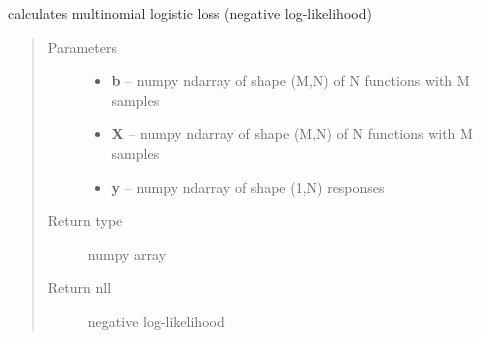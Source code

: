\documentclass[letterpaper,10pt,english]{sphinxmanual}
\begin{document}

\begin{fulllineitems}
\label{regression:regression.mlogit_loss}
calculates multinomial logistic loss (negative log-likelihood)
\begin{quote}\begin{description}
\item[{Parameters}] \leavevmode\begin{itemize}
\item {} 
\textbf{b} -- numpy ndarray of shape (M,N) of N functions with M samples

\item {} 
\textbf{X} -- numpy ndarray of shape (M,N) of N functions with M samples

\item {} 
\textbf{y} -- numpy ndarray of shape (1,N) responses

\end{itemize}

\item[{Return type}] \leavevmode
numpy array

\item[{Return nll}] \leavevmode
negative log-likelihood

\end{description}\end{quote}

\end{fulllineitems}

\end{document}
